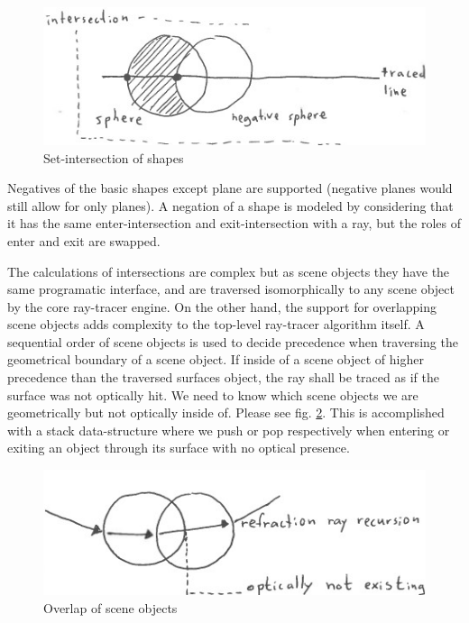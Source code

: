 \documentclass{article}
\begin{document}
\begin{figure}
  \includegraphics[width=\linewidth]{inter.jpeg}
  \caption{Set-intersection of shapes}
  \label{fig:inter}
\end{figure}

Negatives of the basic shapes except plane are supported
(negative planes would still allow for only planes).
A negation of a shape is modeled by considering that it
has the same enter-intersection and exit-intersection
with a ray, but the roles of enter and exit are swapped.

The calculations of intersections are complex but as
scene objects they have the same programatic interface,
and are traversed isomorphically to any scene object by
the core ray-tracer engine.  On the other hand, the support
for overlapping scene objects adds complexity to the
top-level ray-tracer algorithm itself.
A sequential order of scene objects is used to decide
precedence when traversing the geometrical boundary of
a scene object.  If inside of a scene object of higher
precedence than the traversed surfaces object, the ray
shall be traced as if the surface was not optically hit.
We need to know which scene objects we are geometrically
but not optically inside of.  Please see fig. \ref{fig:combi}.
This is accomplished with a stack data-structure
where we push or pop respectively when entering or exiting
an object through its surface with no optical presence.

\begin{figure}
  \includegraphics[width=\linewidth]{combi.jpeg}
  \caption{Overlap of scene objects}
  \label{fig:combi}
\end{figure}
\end{document}

